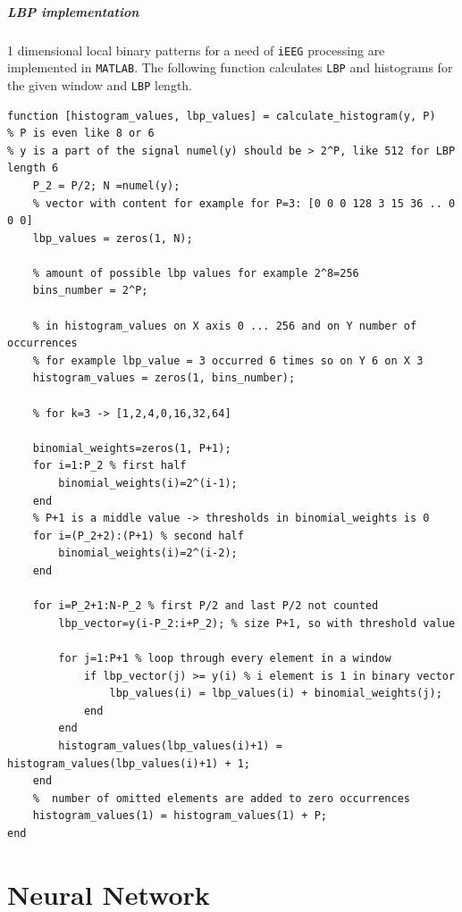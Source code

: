 \paragraph{LBP implementation}
1 dimensional local binary patterns for a need of \verb|iEEG| processing are implemented in \verb|MATLAB|. The following function calculates \verb|LBP| and histograms for the given window and \verb|LBP| length.
\begin{lstlisting}[style=custommatlab,frame=single]
function [histogram_values, lbp_values] = calculate_histogram(y, P)
% P is even like 8 or 6
% y is a part of the signal numel(y) should be > 2^P, like 512 for LBP length 6
    P_2 = P/2; N =numel(y);
    % vector with content for example for P=3: [0 0 0 128 3 15 36 .. 0 0 0]
    lbp_values = zeros(1, N); 
    
    % amount of possible lbp values for example 2^8=256
    bins_number = 2^P;
    
    % in histogram_values on X axis 0 ... 256 and on Y number of occurrences
    % for example lbp_value = 3 occurred 6 times so on Y 6 on X 3
    histogram_values = zeros(1, bins_number);
    
    % for k=3 -> [1,2,4,0,16,32,64] 

    binomial_weights=zeros(1, P+1);
    for i=1:P_2 % first half
        binomial_weights(i)=2^(i-1);
    end
    % P+1 is a middle value -> thresholds in binomial_weights is 0
    for i=(P_2+2):(P+1) % second half
        binomial_weights(i)=2^(i-2);
    end

    for i=P_2+1:N-P_2 % first P/2 and last P/2 not counted
        lbp_vector=y(i-P_2:i+P_2); % size P+1, so with threshold value

        for j=1:P+1 % loop through every element in a window
            if lbp_vector(j) >= y(i) % i element is 1 in binary vector
                lbp_values(i) = lbp_values(i) + binomial_weights(j);
            end
        end
        histogram_values(lbp_values(i)+1) = histogram_values(lbp_values(i)+1) + 1;
    end
    %  number of omitted elements are added to zero occurrences
    histogram_values(1) = histogram_values(1) + P;
end
\end{lstlisting}
\begingroup
\renewcommand{\cleardoublepage}{}
\renewcommand{\clearpage}{}
\chapter{Neural Network}
\endgroup

